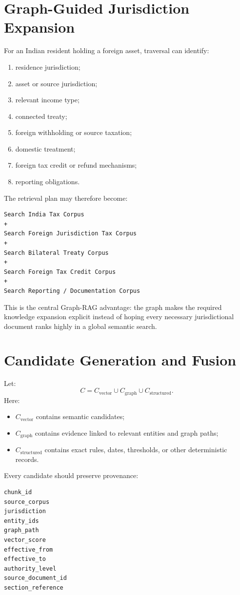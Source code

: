 \documentclass[11pt,a4paper]{article}
\begin{document}
\section{Graph-Guided Jurisdiction Expansion}
For an Indian resident holding a foreign asset, traversal can identify:
\begin{enumerate}
\item residence jurisdiction;
\item asset or source jurisdiction;
\item relevant income type;
\item connected treaty;
\item foreign withholding or source taxation;
\item domestic treatment;
\item foreign tax credit or refund mechanisms;
\item reporting obligations.
\end{enumerate}

The retrieval plan may therefore become:
\begin{lstlisting}
Search India Tax Corpus
+
Search Foreign Jurisdiction Tax Corpus
+
Search Bilateral Treaty Corpus
+
Search Foreign Tax Credit Corpus
+
Search Reporting / Documentation Corpus
\end{lstlisting}

This is the central Graph-RAG advantage: the graph makes the required knowledge expansion explicit instead of hoping every necessary jurisdictional document ranks highly in a global semantic search.

\section{Candidate Generation and Fusion}
Let:
\[
C=C_{\text{vector}}\cup C_{\text{graph}}\cup C_{\text{structured}}.
\]
Here:
\begin{itemize}
\item $C_{\text{vector}}$ contains semantic candidates;
\item $C_{\text{graph}}$ contains evidence linked to relevant entities and graph paths;
\item $C_{\text{structured}}$ contains exact rules, dates, thresholds, or other deterministic records.
\end{itemize}

Every candidate should preserve provenance:
\begin{lstlisting}
chunk_id
source_corpus
jurisdiction
entity_ids
graph_path
vector_score
effective_from
effective_to
authority_level
source_document_id
section_reference
\end{lstlisting}
\end{document}
